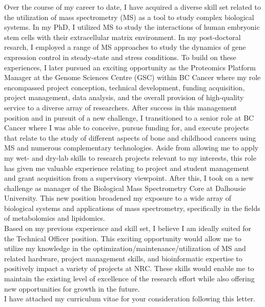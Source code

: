 \documentclass[11pt]{article}
\begin{document}
\noindent
Over the course of my career to date, I have acquired a diverse skill set related to the utilization of mass spectrometry (MS) as a tool to study complex biological systems. In my PhD, I utilized MS to study the interactions of human embryonic stem cells with their extracellular matrix environment. In my post-doctoral resarch, I employed a range of MS approaches to study the dynamics of gene expression control in steady-state and stress conditions. To build on these experiences, I later pursued an exciting opportunity as the Proteomics Platform Manager at the Genome Sciences Centre (GSC) within BC Cancer where my role encompassed project conception, technical development, funding acquisition, project management, data analysis, and the overall provision of high-quality service to a diverse array of researchers. After success in this management position and in pursuit of a new challenge, I transitioned to a senior role at BC Cancer where I was able to conceive, pursue funding for, and execute projects that relate to the study of different aspects of bone and childhood cancers using MS and numerous complementary technologies. Aside from allowing me to apply my wet- and dry-lab skills to research projects relevant to my interests, this role has given me valuable experience relating to project and student management and grant acquisition from a supervisory viewpoint. After this, I took on a new challenge as manager of the Biological Mass Spectrometry Core at Dalhousie University. This new position broadened my exposure to a wide array of biological systems and applications of mass spectrometry, specifically in the fields of metabolomics and lipidomics.\\

\noindent
Based on my previous experience and skill set, I believe I am ideally suited for the Technical Officer position. This exciting opportunity would allow me to utilize my knowledge in the optimization/maintenance/utilization of MS and related hardware, project management skills, and bioinformatic expertise to positively impact a variety of projects at NRC. These skills would enable me to maintain the existing level of excellence of the research effort while also offering new opportunities for growth in the future.\\

\noindent
I have attached my curriculum vitae for your consideration following this letter.
\end{document}
